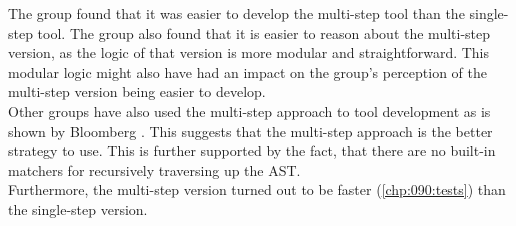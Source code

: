 The group found that it was easier to develop the multi-step tool than the single-step tool.
The group also found that it is easier to reason about the multi-step version, as the logic of that version is more modular and straightforward. 
This modular logic might also have had an impact on the group's perception of the multi-step version being easier to develop.\\
Other groups have also used the multi-step approach to tool development as is shown by Bloomberg \cite{bloombergClangmetatoolFrameworkReusing2023}. This suggests that the multi-step approach is the better strategy to use. This is further supported by the fact, that there are no built-in matchers for recursively traversing up the AST. \\
Furthermore, the multi-step version turned out to be faster (\cref{chp:090:tests}) than the single-step version.
